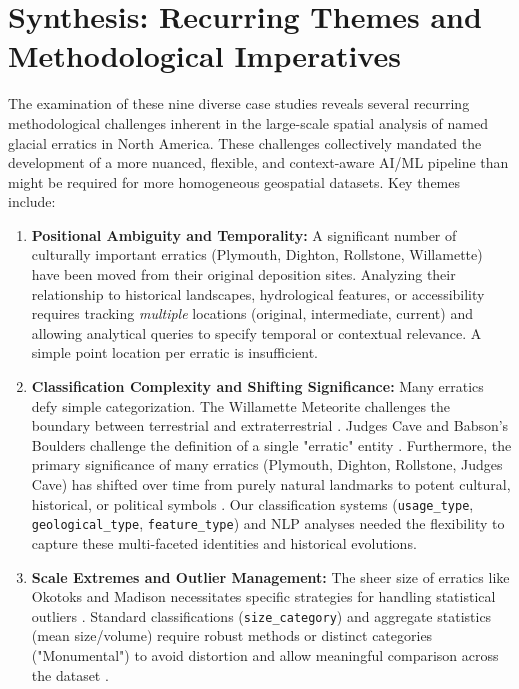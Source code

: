\documentclass[
11pt, %
english, %
singlespacing, %
headsepline, %
]{MastersDoctoralThesis} %
\begin{document}
\section{Synthesis: Recurring Themes and Methodological Imperatives}
\label{sec:synthesis}

The examination of these nine diverse case studies reveals several recurring methodological challenges inherent in the large-scale spatial analysis of named glacial erratics in North America. These challenges collectively mandated the development of a more nuanced, flexible, and context-aware AI/ML pipeline than might be required for more homogeneous geospatial datasets. Key themes include:

\begin{enumerate}
    \item \textbf{Positional Ambiguity and Temporality:} A significant number of culturally important erratics (Plymouth, Dighton, Rollstone, Willamette) have been moved from their original deposition sites. Analyzing their relationship to historical landscapes, hydrological features, or accessibility requires tracking \emph{multiple} locations (original, intermediate, current) and allowing analytical queries to specify temporal or contextual relevance. A simple point location per erratic is insufficient.
    \item \textbf{Classification Complexity and Shifting Significance:} Many erratics defy simple categorization. The Willamette Meteorite challenges the boundary between terrestrial and extraterrestrial \cite{AMNHWillamette, Pasek2008}. Judges Cave and Babson's Boulders challenge the definition of a single "erratic" entity \cite{Dana1891, Moore2005}. Furthermore, the primary significance of many erratics (Plymouth, Dighton, Rollstone, Judges Cave) has shifted over time from purely natural landmarks to potent cultural, historical, or political symbols \cite{Seelye1997, Lenik2009, googleLewistonEvening, Stiles1794}. Our classification systems (\texttt{usage\_type}, \texttt{geological\_type}, \texttt{feature\_type}) and NLP analyses needed the flexibility to capture these multi-faceted identities and historical evolutions.
    \item \textbf{Scale Extremes and Outlier Management:} The sheer size of erratics like Okotoks and Madison necessitates specific strategies for handling statistical outliers \cite{AlbertaOkotoks, NHMadisonBoulder}. Standard classifications (\texttt{size\_category}) and aggregate statistics (mean size/volume) require robust methods or distinct categories ("Monumental") to avoid distortion and allow meaningful comparison across the dataset \cite{Cuffey2010}.

\end{enumerate}
\end{document}
